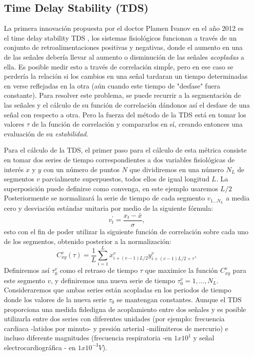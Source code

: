 \documentclass[twoside,twocolumn]{article}
\begin{document}
\subsection{Time Delay Stability (TDS)}
La primera innovación propuesta por el doctor Plamen Ivanov en el año 2012 es el time delay stability {TDS} \cite{bashan2012network}, los sistemas fisiológicos funcionan a través de un conjunto de retroalimentaciones positivas y negativas, donde el aumento en una de las señales debería llevar al aumento o disminución de las señales \textit{acopladas} a ella. Es posible medir esto a través de correlación simpĺe, pero en ese caso se perdería la relación si los cambios en una señal tardaran un tiempo determinadas en verse reflejadas en la otra (aún cuando este tiempo de "desfase" fuera constante).
Para resolver este problema, se puede recurrir a la segmentación de las señales y el cálculo de su función de correlación dándonos así el desfase de una señal con respecto a otra. Pero la fuerza del método de la TDS está en tomar los valores $\tau$ de la función de correlación y compararlos en sí, creando entonces una evaluación de su \textit{estabilidad}.

Para el cálculo de la TDS, el primer paso para el cálculo de esta métrica consiste en tomar dos series de tiempo correspondientes a dos variables fisiológicas de interés $x$ y $y$ con un número de puntos $N$ que dividiremos en una número $N_L$ de segmentos $v$ parcialmente superpuestos, todos ellos de igual longitud $L$.
La superposición puede definirse como convenga, en este ejemplo usaremos $L/2$
Posteriormente se normalizará la serie de tiempo de cada segmento $v_{1...N_L}$ a media cero y desviación estándar unitaria por medio de la siguiente fórmula:
\begin{equation}
  v^\prime_t = \frac{x_t-\bar{x}}{\sigma} ,
\end{equation}
esto con el fin de poder utilizar la siguiente función de correlación sobre cada uno de los segmentos, obtenido posterior a la normalización:
\begin{equation}
  C^v_{xy}(\tau)=\frac{1}{L}\sum^L_{i=1}x^v_{i+(v-1)L/2}y^v_{i+(v-1)L/2+\tau} ,
\end{equation}
Definiremos así $\tau^v_0$ como el retraso de tiempo $\tau$ que maximice la función $C^v_{xy}$ para este segmento $v$, y definiremos una nueva serie de tiempo ${\tau^v_0}=1,...,N_L$.
Consideraremos que ambas series están acopladas en los periodos de tiempo donde los valores de la nueva serie $\tau_0$ se mantengan constantes.
Aunque el TDS proporciona una medida fidedigna de acoplamiento entre dos señales y es posible utilizarla entre dos series con diferentes unidades (por ejemplo: frecuencia cardiaca -latidos por minuto- y presión arterial -milímiteros de mercurio) e incluso diferente magnitudes (frecuencia respiratoria -en $1x10^1$ y señal electrocardiográfica - en $1x10^{-3}V$). 
\end{document}
